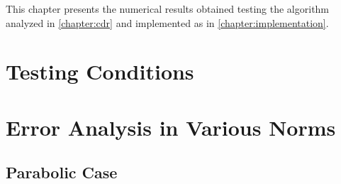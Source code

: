 This chapter presents the numerical results obtained testing the algorithm analyzed in \cref{chapter:cdr} and implemented as in \cref{chapter:implementation}.

\section{Testing Conditions}

\newpage
\section{Error Analysis in Various Norms}

\subsection{Parabolic Case}

\begin{figure}[!ht]
    \begin{subfigure}[t]{0.49\textwidth}
        \centering
        
    \end{subfigure}
    \hfill
    \begin{subfigure}[t]{0.49\textwidth}
        \centering
        
    \end{subfigure}
\end{figure}

\begin{figure}[!ht]
    \begin{subfigure}[t]{0.49\textwidth}
        \centering
        
    \end{subfigure}
    \hfill
    \begin{subfigure}[t]{0.49\textwidth}
        \centering
        
    \end{subfigure}
\end{figure}

\newpage

\begin{figure}[!ht]
    \begin{subfigure}[t]{0.49\textwidth}
        \centering
        
    \end{subfigure}
    \hfill
    \begin{subfigure}[t]{0.49\textwidth}
        \centering
        
    \end{subfigure}
\end{figure}

